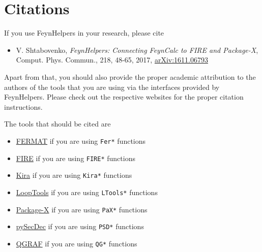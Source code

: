 \documentclass[../FeynHelpersManual.tex]{subfiles}
\begin{document}
\hypertarget{citations}{
\section{Citations}\label{citations}}

If you use FeynHelpers in your research, please cite

\begin{itemize}
\tightlist
\item
  V. Shtabovenko, \emph{FeynHelpers: Connecting FeynCalc to FIRE and
  Package-X}, Comput. Phys. Commun., 218, 48-65, 2017,
  \href{https://arxiv.org/abs/1611.06793}{arXiv:1611.06793}
\end{itemize}

Apart from that, you should also provide the proper academic attribution
to the authors of the tools that you are using via the interfaces
provided by FeynHelpers. Please check out the respective websites for
the proper citation instructions.

The tools that should be cited are

\begin{itemize}
\item
  \href{https://home.bway.net/lewis/}{FERMAT} if you are using
  \texttt{Fer*} functions
\item
  \href{https://bitbucket.org/feynmanIntegrals/fire/}{FIRE} if you are
  using \texttt{FIRE*} functions
\item
  \href{https://gitlab.com/kira-pyred/kira/}{Kira} if you are using
  \texttt{Kira*} functions
\item
  \href{http://www.feynarts.de/looptools/}{LoopTools} if you are using
  \texttt{LTools*} functions
\item
  \href{https://packagex.hepforge.org/}{Package-X} if you are using
  \texttt{PaX*} functions
\item
  \href{https://secdec.readthedocs.io/en/stable/}{pySecDec} if you are
  using \texttt{PSD*} functions
\item
  \href{http://cfif.ist.utl.pt/~paulo/qgraf.html}{QGRAF} if you are
  using \texttt{QG*} functions
\end{itemize}
\end{document}
